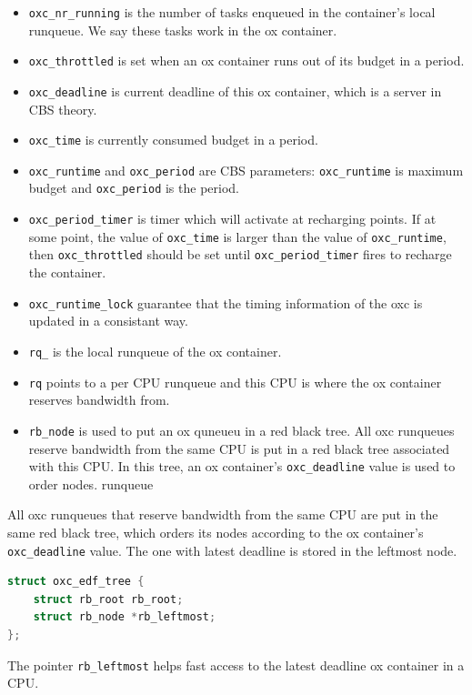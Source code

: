 \begin{itemize}
\item \texttt{oxc\_nr\_running} is the number of tasks enqueued in the 
		container's local runqueue. We say these tasks work in 
		the ox container.
\item \texttt{oxc\_throttled} is set when an ox container runs out of
		its budget in a period.
\item \texttt{oxc\_deadline} is current deadline of this ox container,
		which is a server in CBS theory.
\item \texttt{oxc\_time} is currently consumed budget in a period.
\item \texttt{oxc\_runtime} and \texttt{oxc\_period} are CBS parameters:
		\texttt{oxc\_runtime} is maximum budget and 
		\texttt{oxc\_period} is the period.
\item \texttt{oxc\_period\_timer} is timer which will activate at recharging
		points. If at some point, the value of \texttt{oxc\_time} is 
		larger than the value of \texttt{oxc\_runtime}, then
		\texttt{oxc\_throttled} should be set until 
		\texttt{oxc\_period\_timer} fires to recharge the container.
\item \texttt{oxc\_runtime\_lock} guarantee that the timing information of the 
		oxc is updated in a consistant way.
\item \texttt{rq\_} is the local runqueue of the ox container.
\item \texttt{rq} points to a per CPU runqueue and this CPU is where the 
		ox container reserves bandwidth from.
\item \texttt{rb\_node} is used to put an ox quneueu in a red black tree.
		All oxc runqueues reserve bandwidth from the same CPU
		is put in a red black tree associated with this CPU.
		In this tree, an ox container's \texttt{oxc\_deadline} 
		value is used to order nodes.
		runqueue 
\end{itemize}

All oxc runqueues that reserve bandwidth from the same CPU are put in the 
same red black tree, which orders its nodes according to the ox container's
\texttt{oxc\_deadline} value. The one with latest deadline is stored in the
leftmost node. 
\begin{lstlisting}[language=C]
struct oxc_edf_tree {
	struct rb_root rb_root;
	struct rb_node *rb_leftmost;
};
\end{lstlisting}
The pointer \texttt{rb\_leftmost} helps fast access to the latest deadline
ox container in a CPU.

